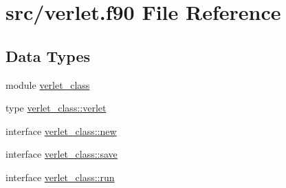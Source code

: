 \hypertarget{verlet_8f90}{\section{src/verlet.f90 File Reference}
\label{verlet_8f90}
}
\subsection*{Data Types}
\begin{DoxyCompactItemize}
\item 
module \hyperlink{classverlet__class}{verlet\+\_\+class}
\item 
type \hyperlink{structverlet__class_1_1verlet}{verlet\+\_\+class\+::verlet}
\item 
interface \hyperlink{interfaceverlet__class_1_1new}{verlet\+\_\+class\+::new}
\item 
interface \hyperlink{interfaceverlet__class_1_1save}{verlet\+\_\+class\+::save}
\item 
interface \hyperlink{interfaceverlet__class_1_1run}{verlet\+\_\+class\+::run}
\end{DoxyCompactItemize}
